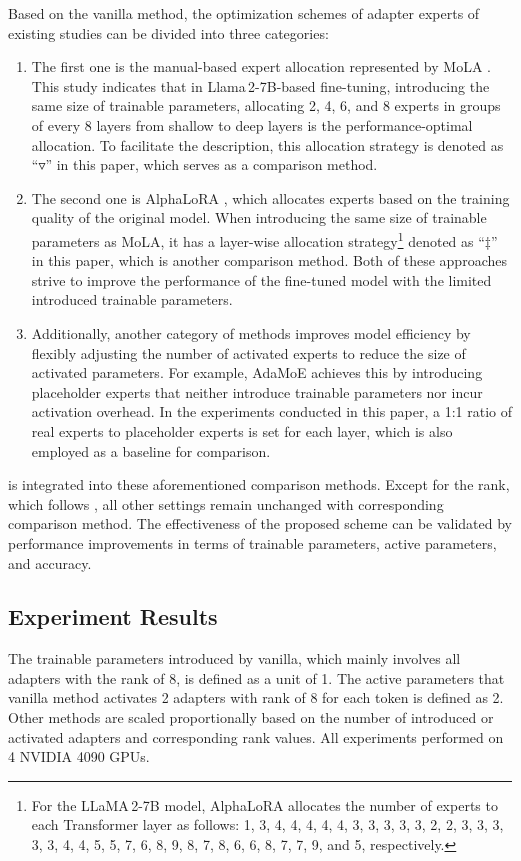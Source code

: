 Based on the vanilla method, the optimization schemes of adapter experts of existing studies can be divided into three categories: 
\begin{enumerate}[label=(\alph*)]
\item The first one is the manual-based expert allocation represented by MoLA \cite{gao2024higher}. This study indicates that in Llama\,2-7B-based fine-tuning, introducing the same size of trainable parameters, allocating 2, 4, 6, and 8 experts in groups of every 8 layers from shallow to deep layers is the performance-optimal allocation. To facilitate the description, this allocation strategy is denoted as “$\triangledown$” in this paper, which serves as a comparison method. 

\item The second one is AlphaLoRA \cite{qing2024alphalora}, which allocates experts based on the training quality of the original model. When introducing the same size of trainable parameters as MoLA, it has a layer-wise allocation strategy\footnote{For the LLaMA\,2-7B model, AlphaLoRA allocates the number of experts to each Transformer layer as follows: 1, 3, 4, 4, 4, 4, 4, 3, 3, 3, 3, 3, 2, 2, 3, 3, 3, 3, 3, 4, 4, 5, 5, 7, 6, 8, 9, 8, 7, 8, 6, 6, 8, 7, 7, 9, and 5, respectively.} denoted as “$\ddagger$” in this paper, which is another comparison method. Both of these approaches strive to improve the performance of the fine-tuned model with the limited introduced trainable parameters. 

\item Additionally, another category of methods improves model efficiency by flexibly adjusting the number of activated experts to reduce the size of activated parameters. For example, AdaMoE \cite{zeng2024adamoe} achieves this by introducing placeholder experts that neither introduce trainable parameters nor incur activation overhead. In the experiments conducted in this paper, a 1:1 ratio of real experts to placeholder experts is set for each layer, which is also employed as a baseline for comparison. 
\end{enumerate}

\name is integrated into these aforementioned comparison methods. Except for the rank, which follows \name, all other settings remain unchanged with corresponding comparison method. The effectiveness of the proposed scheme can be validated by performance improvements in terms of trainable parameters, active parameters, and accuracy.

\subsection{Experiment Results}
The trainable parameters introduced by vanilla, which mainly involves all adapters with the rank of 8, is defined as a unit of 1. The active parameters that vanilla method activates 2 adapters with rank of 8 for each token is defined as 2. Other methods are scaled proportionally based on the number of introduced or activated adapters and corresponding rank values. All experiments performed on 4 NVIDIA 4090 GPUs.

